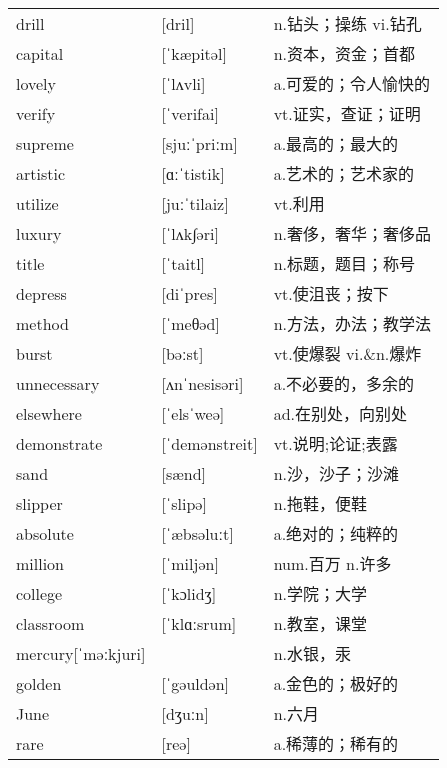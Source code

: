 \documentclass[a4paper]{article}
\begin{document}
\section{}
\begin{tabular}{l l l}

drill & [dril] & n.钻头；操练 vi.钻孔 \\
capital & [ˈkæpitəl] & n.资本，资金；首都 \\
lovely & [ˈlʌvli] & a.可爱的；令人愉快的 \\
verify & [ˈverifai] & vt.证实，查证；证明 \\
supreme & [sjuːˈpriːm] & a.最高的；最大的 \\
artistic & [ɑːˈtistik] & a.艺术的；艺术家的 \\
utilize & [juːˈtilaiz] & vt.利用 \\
luxury & [ˈlʌk∫əri] & n.奢侈，奢华；奢侈品 \\
title & [ˈtaitl] & n.标题，题目；称号 \\
depress & [diˈpres] & vt.使沮丧；按下 \\
method & [ˈmeθəd] & n.方法，办法；教学法 \\
burst & [bəːst] & vt.使爆裂 vi.\&n.爆炸 \\
unnecessary & [ʌnˈnesisəri] & a.不必要的，多余的 \\
elsewhere & [ˈelsˈweə] & ad.在别处，向别处 \\
demonstrate & [ˈdemənstreit] & vt.说明;论证;表露 \\
sand & [sænd] & n.沙，沙子；沙滩 \\
slipper & [ˈslipə] & n.拖鞋，便鞋 \\
absolute & [ˈæbsəluːt] & a.绝对的；纯粹的 \\
million & [ˈmiljən] & num.百万 n.许多 \\
college & [ˈkɔlidʒ] & n.学院；大学 \\
classroom & [ˈklɑːsrum] & n.教室，课堂 \\
mercury[ˈməːkjuri] &  & n.水银，汞 \\
golden & [ˈgəuldən] & a.金色的；极好的 \\
June & [dʒuːn] & n.六月 \\
rare & [reə] & a.稀薄的；稀有的 \\

\end{tabular}
\end{document}
